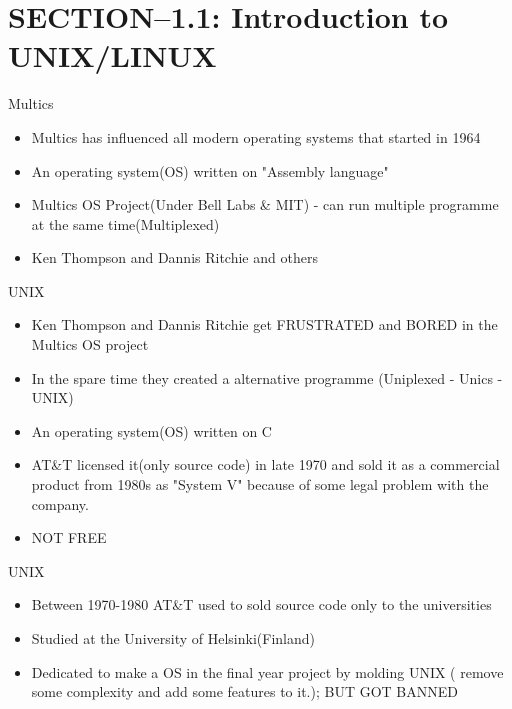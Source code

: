 


\maketitle
\section{SECTION--1.1: Introduction to UNIX/LINUX}
\begin{frame}[t]{Multics}
    \begin{itemize}
      \item Multics has influenced all modern operating systems that started in 1964
      \item An operating system(OS) written on "Assembly language"
      \item Multics OS Project(Under Bell Labs \& MIT) - can run multiple programme at the same time(Multiplexed)
      \item Ken Thompson and Dannis Ritchie and others
       
 \end{itemize}
\end{frame}
\begin{frame}[t]{UNIX}
	\begin{itemize}
		\item Ken Thompson and Dannis Ritchie get FRUSTRATED and BORED in the Multics OS project
		\item In the spare time they created a alternative programme (Uniplexed - Unics - UNIX) 
		\item An operating system(OS) written on C
		 
		\item AT\&T licensed it(only source code) in late 1970 and sold it as a commercial product from 1980s as "System V" because of some legal problem with the company.
		\item NOT FREE
	
	\end{itemize}
\end{frame}

\begin{frame}[t]{UNIX}
	\begin{itemize}
		\item Between 1970-1980 AT\&T used to sold source code only to the universities
		\item Studied at the University of Helsinki(Finland) 
		\item Dedicated to make a OS in the final year project by molding UNIX ( remove some complexity and add some features to it.); BUT GOT BANNED
		
		
		
		
	\end{itemize}
\end{frame}

